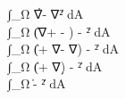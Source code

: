 ∫_Ω \left\|∇\x - \Rot ∇\hat{\x}\right\|² \;dA \\
∫_Ω \left\|(∇\x + \I - \I) - \Rot \I \right\|² \;dA \\
∫_Ω \left\|(\I + ∇\x - ∇) - \Rot \right\|² \;dA \\
∫_Ω \left\|(\I + ∇\d) - \Rot \right\|² \;dA \\
∫_Ω \left\|\F - \Rot \right\|² \;dA \\
